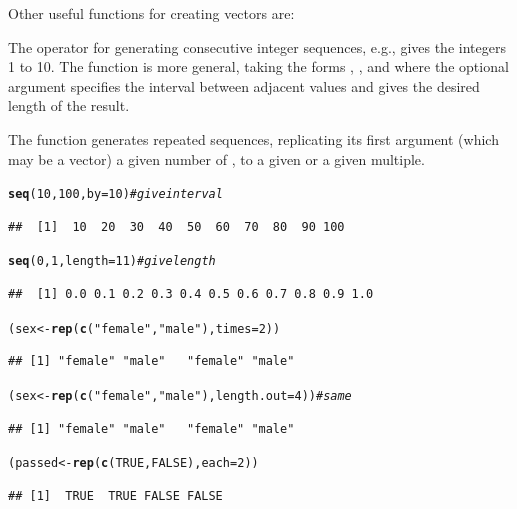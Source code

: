 \documentclass[11pt]{book}\usepackage[]{graphicx}\usepackage[]{color}
\makeatletter
\newcommand{\hlnum}[1]{\textcolor[rgb]{0.686,0.059,0.569}{#1}}%
\newcommand{\hlstr}[1]{\textcolor[rgb]{0.192,0.494,0.8}{#1}}%
\newcommand{\hlcom}[1]{\textcolor[rgb]{0.678,0.584,0.686}{\textit{#1}}}%
\newcommand{\hlstd}[1]{\textcolor[rgb]{0.345,0.345,0.345}{#1}}%
\newcommand{\hlkwb}[1]{\textcolor[rgb]{0.69,0.353,0.396}{#1}}%
\newcommand{\hlkwc}[1]{\textcolor[rgb]{0.333,0.667,0.333}{#1}}%
\newcommand{\hlkwd}[1]{\textcolor[rgb]{0.737,0.353,0.396}{\textbf{#1}}}%
\newenvironment{kframe}{%
 \def\at@end@of@kframe{}%
 \ifinner\ifhmode%
  \def\at@end@of@kframe{\end{minipage}}%
  \begin{minipage}{\columnwidth}%
 \fi\fi%
 \def\FrameCommand##1{\hskip\@totalleftmargin \hskip-\fboxsep
 \colorbox{shadecolor}{##1}\hskip-\fboxsep
     \hskip-\linewidth \hskip-\@totalleftmargin \hskip\columnwidth}%
 \MakeFramed {\advance\hsize-\width
   \@totalleftmargin\z@ \linewidth\hsize
   \@setminipage}}%
 {\par\unskip\endMakeFramed%
 \at@end@of@kframe}
\newenvironment{knitrout}{}{} %
\renewenvironment{knitrout}{\small\renewcommand{\baselinestretch}{.85}}{} %
\makeatother
\begin{document}
Other useful functions for creating vectors are:
\begin{itemize*}
  \item The \code{:} operator for generating consecutive integer sequences, e.g.,
   gives the integers 1 to 10.  The  function is more general, taking the forms
,
, and
 where the optional argument  specifies the interval between adjacent values and  gives the desired length of the
result.

  \item The  function generates repeated sequences, replicating
  its first argument (which may be a vector) a given number of ,
  to a given  or  a given multiple.
\end{itemize*}

\begin{knitrout}
\color{fgcolor}\begin{kframe}
\begin{alltt}
\hlkwd{seq}\hlstd{(}\hlnum{10}\hlstd{,} \hlnum{100}\hlstd{,} \hlkwc{by}\hlstd{=}\hlnum{10}\hlstd{)}      \hlcom{# give interval}
\end{alltt}
\begin{verbatim}
##  [1]  10  20  30  40  50  60  70  80  90 100
\end{verbatim}
\begin{alltt}
\hlkwd{seq}\hlstd{(}\hlnum{0}\hlstd{,} \hlnum{1}\hlstd{,} \hlkwc{length}\hlstd{=}\hlnum{11}\hlstd{)}     \hlcom{# give length}
\end{alltt}
\begin{verbatim}
##  [1] 0.0 0.1 0.2 0.3 0.4 0.5 0.6 0.7 0.8 0.9 1.0
\end{verbatim}
\begin{alltt}
\hlstd{(sex} \hlkwb{<-} \hlkwd{rep}\hlstd{(}\hlkwd{c}\hlstd{(}\hlstr{"female"}\hlstd{,} \hlstr{"male"}\hlstd{),} \hlkwc{times}\hlstd{=}\hlnum{2}\hlstd{))}
\end{alltt}
\begin{verbatim}
## [1] "female" "male"   "female" "male"
\end{verbatim}
\begin{alltt}
\hlstd{(sex} \hlkwb{<-} \hlkwd{rep}\hlstd{(}\hlkwd{c}\hlstd{(}\hlstr{"female"}\hlstd{,} \hlstr{"male"}\hlstd{),} \hlkwc{length.out}\hlstd{=}\hlnum{4}\hlstd{))}  \hlcom{# same}
\end{alltt}
\begin{verbatim}
## [1] "female" "male"   "female" "male"
\end{verbatim}
\begin{alltt}
\hlstd{(passed} \hlkwb{<-} \hlkwd{rep}\hlstd{(}\hlkwd{c}\hlstd{(}\hlnum{TRUE}\hlstd{,} \hlnum{FALSE}\hlstd{),} \hlkwc{each}\hlstd{=}\hlnum{2}\hlstd{))}
\end{alltt}
\begin{verbatim}
## [1]  TRUE  TRUE FALSE FALSE
\end{verbatim}
\end{kframe}
\end{knitrout}
\end{document}
